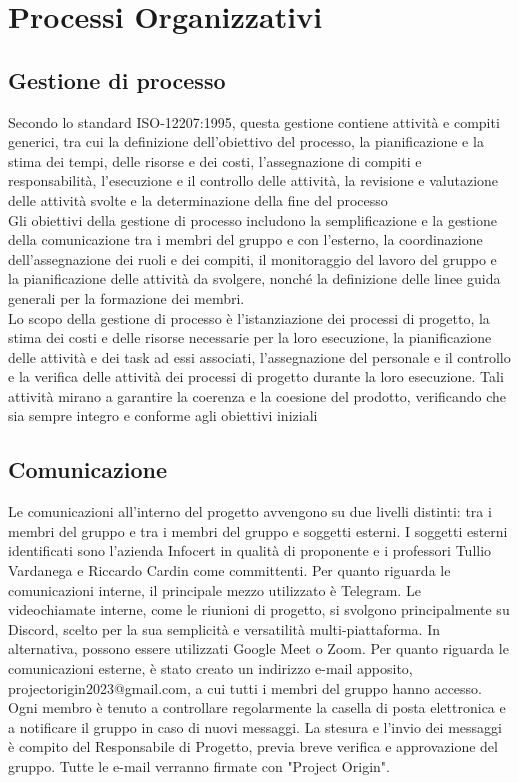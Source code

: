 \section{Processi Organizzativi}

\subsection{Gestione di processo}
Secondo lo standard ISO-12207:1995, questa gestione contiene attività e compiti generici, tra cui la definizione dell'obiettivo del processo, la pianificazione e la stima 
dei tempi, delle risorse e dei costi, l'assegnazione di compiti e responsabilità, l'esecuzione e il controllo delle attività, la revisione e valutazione delle attività svolte 
e la determinazione della fine del processo \\
Gli obiettivi della gestione di processo includono la semplificazione e la gestione della comunicazione tra i membri del gruppo e con l'esterno, la coordinazione 
dell'assegnazione dei ruoli e dei compiti, il monitoraggio del lavoro del gruppo e la pianificazione delle attività da svolgere, nonché la definizione delle linee guida 
generali per la formazione dei membri. \\
Lo scopo della gestione di processo è l'istanziazione dei processi di progetto, la stima dei costi e delle risorse necessarie per la loro esecuzione, la pianificazione 
delle attività e dei task ad essi associati, l'assegnazione del personale e il controllo e la verifica delle attività dei processi di progetto durante la loro esecuzione. 
Tali attività mirano a garantire la coerenza e la coesione del prodotto, verificando che sia sempre integro e conforme agli obiettivi iniziali 

\subsection{Comunicazione}
Le comunicazioni all'interno del progetto avvengono su due livelli distinti: tra i membri del gruppo e tra i membri del gruppo e soggetti esterni. I soggetti esterni 
identificati sono l'azienda Infocert in qualità di proponente e i professori Tullio Vardanega e Riccardo Cardin come committenti. Per quanto riguarda le comunicazioni interne, 
il principale mezzo utilizzato è Telegram. Le videochiamate interne, come le riunioni di progetto, si svolgono principalmente su Discord, scelto per la sua semplicità e 
versatilità multi-piattaforma. In alternativa, possono essere utilizzati Google Meet o Zoom. Per quanto riguarda le comunicazioni esterne, è stato creato un indirizzo e-mail 
apposito, projectorigin2023@gmail.com, a cui tutti i membri del gruppo hanno accesso. Ogni membro è tenuto a controllare regolarmente la casella di posta elettronica e a 
notificare il gruppo in caso di nuovi messaggi. La stesura e l'invio dei messaggi è compito del Responsabile di Progetto, previa breve verifica e approvazione del gruppo. 
Tutte le e-mail verranno firmate con "Project Origin". 

